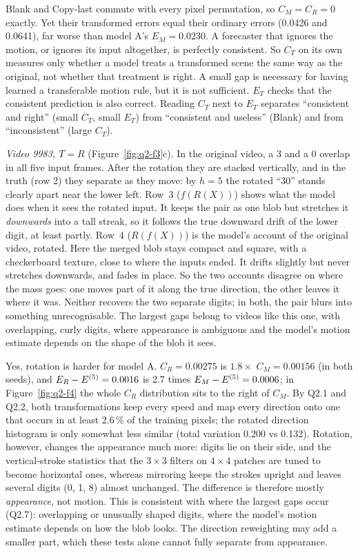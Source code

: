  Blank and Copy-last commute with every pixel permutation, so $C_M=C_R=0$ exactly. Yet their
transformed errors equal their ordinary errors (0.0426 and 0.0641), far worse than model A's $E_M=0.0230$.
A forecaster that ignores the motion, or ignores its input altogether, is perfectly consistent. So $C_T$
on its own measures only whether a model treats a transformed scene the same way as the original, not
whether that treatment is right. A small gap is necessary for having learned a transferable motion rule,
but it is not sufficient. $E_T$ checks that the consistent prediction is also correct. Reading $C_T$ next
to $E_T$ separates ``consistent and right'' (small $C_T$, small $E_T$) from ``consistent and useless''
(Blank) and from ``inconsistent'' (large $C_T$).

 \emph{Video 9983, $T=R$} (Figure~\ref{fig:q2-f3}c). In the original video, a 3 and a 0 overlap
in all five input frames. After the rotation they are stacked vertically, and in the truth (row 2) they
separate as they move: by $h=5$ the rotated ``30'' stands clearly apart near the lower left.
Row~3 ($f(R(X))$) shows what the model does when it sees the rotated input. It keeps the pair as one blob
but stretches it \emph{downwards} into a tall streak, so it follows the true downward drift of the
lower digit, at least partly. Row~4 ($R(f(X))$) is the model's account of the original video, rotated. Here
the merged blob stays compact and square, with a checkerboard texture, close to where the inputs ended.
It drifts slightly but never stretches downwards, and fades in place. So the two accounts disagree on
where the mass goes: one moves part of it along the true direction, the other leaves it where it was.
Neither recovers the two separate digits; in both, the pair blurs into something unrecognisable. The
largest gaps belong to videos like this one, with overlapping, curly digits, where appearance is
ambiguous and the model's motion estimate depends on the shape of the blob it sees.

 Yes, rotation is harder for model A. $C_R=0.00275$ is $1.8\times$ $C_M=0.00156$ (in both
seeds), and $E_R-E^{(5)}=0.0016$ is 2.7 times $E_M-E^{(5)}=0.0006$; in Figure~\ref{fig:q2-f4} the whole $C_R$
distribution sits to the right of $C_M$. By Q2.1 and Q2.2, both transformations keep every speed and map
every direction onto one that occurs in at least 2.6\,\% of the training pixels; the rotated direction
histogram is only somewhat less similar (total variation 0.200 vs 0.132). Rotation, however, changes
the appearance much more: digits lie on their side, and the vertical-stroke statistics that the $3\times3$
filters on $4\times4$ patches are tuned to become horizontal ones, whereas mirroring keeps the strokes
upright and leaves several digits (0, 1, 8) almost unchanged. The difference is therefore mostly
\emph{appearance}, not motion. This is consistent with where the largest gaps occur (Q2.7): overlapping
or unusually shaped digits, where the model's motion estimate depends on how the blob looks. The direction
reweighting may add a smaller part, which these tests alone cannot fully separate from appearance.

